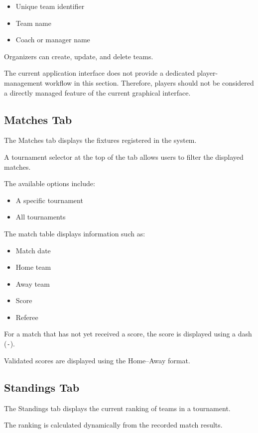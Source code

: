 \documentclass[12pt,a4paper]{article}
\begin{document}
\begin{itemize}
\item Unique team identifier
\item Team name
\item Coach or manager name
\end{itemize}

Organizers can create, update, and delete teams.

The current application interface does not provide a dedicated
player-management workflow in this section. Therefore, players
should not be considered a directly managed feature of the
current graphical interface.

\subsection{Matches Tab}

The Matches tab displays the fixtures registered in the system.

A tournament selector at the top of the tab allows users to
filter the displayed matches.

The available options include:

\begin{itemize}
\item A specific tournament
\item All tournaments
\end{itemize}

The match table displays information such as:

\begin{itemize}
\item Match date
\item Home team
\item Away team
\item Score
\item Referee
\end{itemize}

For a match that has not yet received a score, the score is
displayed using a dash (\texttt{-}).

Validated scores are displayed using the
Home--Away format.

\subsection{Standings Tab}

The Standings tab displays the current ranking of teams in a
tournament.

The ranking is calculated dynamically from the recorded match
results.
\end{document}
